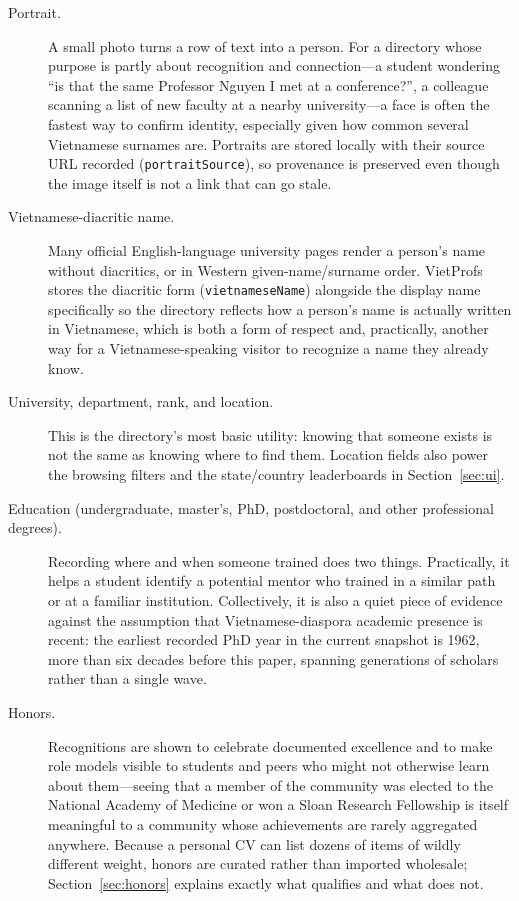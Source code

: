 \documentclass[11pt]{article}
\newcommand{\code}[1]{\texttt{\small #1}}
\begin{document}
\begin{description}
\item[Portrait.] A small photo turns a row of text into a person.
For a directory whose purpose is partly about recognition and connection---a student wondering ``is that the same Professor Nguyen I met at a conference?'', a colleague scanning a list of new faculty at a nearby university---a face is often the fastest way to confirm identity, especially given how common several Vietnamese surnames are.
Portraits are stored locally with their source URL recorded (\code{portraitSource}), so provenance is preserved even though the image itself is not a link that can go stale.
\item[Vietnamese-diacritic name.] Many official English-language university pages render a person's name without diacritics, or in Western given-name/surname order.
VietProfs stores the diacritic form (\code{vietnameseName}) alongside the display name specifically so the directory reflects how a person's name is actually written in Vietnamese, which is both a form of respect and, practically, another way for a Vietnamese-speaking visitor to recognize a name they already know.
\item[University, department, rank, and location.] This is the directory's most basic utility: knowing that someone exists is not the same as knowing where to find them.
Location fields also power the browsing filters and the state/country leaderboards in Section~\ref{sec:ui}.
\item[Education (undergraduate, master's, PhD, postdoctoral, and other professional degrees).] Recording where and when someone trained does two things.
Practically, it helps a student identify a potential mentor who trained in a similar path or at a familiar institution.
Collectively, it is also a quiet piece of evidence against the assumption that Vietnamese-diaspora academic presence is recent: the earliest recorded PhD year in the current snapshot is 1962, more than six decades before this paper, spanning generations of scholars rather than a single wave.
\item[Honors.] Recognitions are shown to celebrate documented excellence and to make role models visible to students and peers who might not otherwise learn about them---seeing that a member of the community was elected to the National Academy of Medicine or won a Sloan Research Fellowship is itself meaningful to a community whose achievements are rarely aggregated anywhere.
Because a personal CV can list dozens of items of wildly different weight, honors are curated rather than imported wholesale; Section~\ref{sec:honors} explains exactly what qualifies and what does not.

\end{description}
\end{document}
